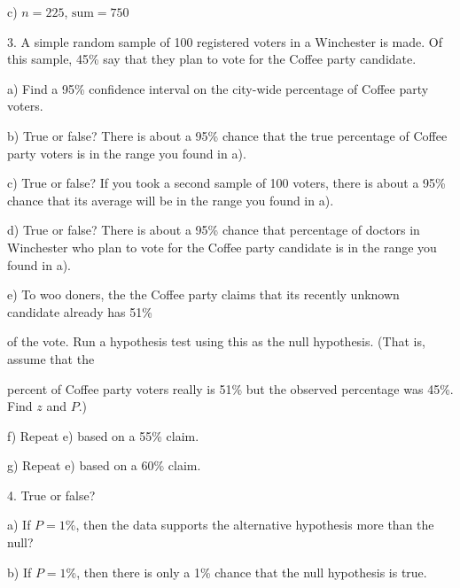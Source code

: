 \documentclass[10pt]{article}
\begin{document}
\hspace{10pt} c) $n=225$, $\mbox{sum}=750$
\vfill
\eject


3. A simple random sample of 100 registered voters in a Winchester is made.  
Of this sample, 45\% say that they plan to vote for the Coffee party candidate.

\hspace{10pt} a) Find a 95\% confidence interval on the city-wide percentage of 
  Coffee party voters.
\vspace{1.75in}

\hspace{10pt} b) True or false?  There is about a 95\% chance that the true percentage
of Coffee party voters is in the range you found in a).
\medskip

\hspace{10pt} c) True or false?  If you took a second sample of 100 voters, 
there is about a 95\% chance that its average 
will be in the range you found in a).
\medskip

\hspace{10pt} d) True or false?  There is about a 95\% chance that percentage
of  doctors in Winchester who plan to vote for the Coffee party candidate is in the
range you found in a).
\medskip

\hspace{10pt} e) To woo doners, the the Coffee party claims that its recently
  unknown candidate already has 51\%\vspace{-5pt}

\HH of the vote.  Run a hypothesis test
  using this as the null hypothesis. (That is, assume that the \vspace{-5pt}

\HH percent of Coffee party
voters really is 51\% but the observed percentage was 45\%.  Find $z$ and $P$.)
 \vspace{1.7in}

\hspace{10pt} f) Repeat e) based on a 55\% claim.
 \vspace{1.7in}

\hspace{10pt} g) Repeat e) based on a 60\% claim.
\vfill
\eject

4. True or false?

\hspace{10pt} a) If $P=1$\%, then the  data supports the alternative
hypothesis more than the null?
\medskip

\hspace{10pt} b) If $P=1$\%, then there is only a 1\% chance that the null 
  hypothesis is true.
\medskip
\end{document}

